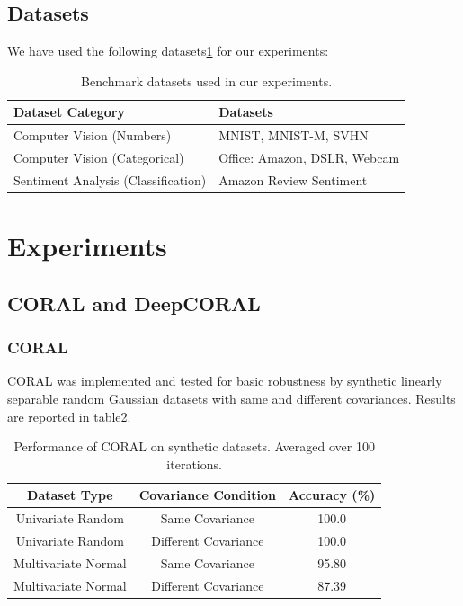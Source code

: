 \documentclass{article}
\begin{document}
\subsection{Datasets}
We have used the following datasets\ref{tab:datasets} for our experiments:
\begin{table}[h]
  \centering
  \caption{Benchmark datasets used in our experiments.}
  \label{tab:datasets}
  \begin{tabular}{ll}
      \toprule
      \textbf{Dataset Category} & \textbf{Datasets} \\
      \midrule
      Computer Vision (Numbers)     & MNIST, MNIST-M, SVHN \\
      Computer Vision (Categorical) & Office: Amazon, DSLR, Webcam \\
      Sentiment Analysis (Classification)  & Amazon Review Sentiment \\
      \bottomrule
  \end{tabular}
\end{table}


\section{Experiments}
\subsection{CORAL and DeepCORAL}
\subsubsection{CORAL}
CORAL was implemented and tested for basic robustness by synthetic linearly separable random Gaussian datasets with same and different covariances. Results are reported in table\ref{tab:coral}.
\begin{table}[h]
  \centering
  \caption{Performance of CORAL on synthetic datasets. Averaged over 100 iterations.}
  \label{tab:coral}
  \begin{tabular}{ccc}
    \toprule
    \textbf{Dataset Type} & \textbf{Covariance Condition} & \textbf{Accuracy (\%)} \\
    \midrule
    Univariate Random & Same Covariance & 100.0 \\
    Univariate Random & Different Covariance & 100.0 \\
    Multivariate Normal & Same Covariance & 95.80 \\
    Multivariate Normal & Different Covariance & 87.39 \\
    \bottomrule
  \end{tabular}
\end{table}
\end{document}
